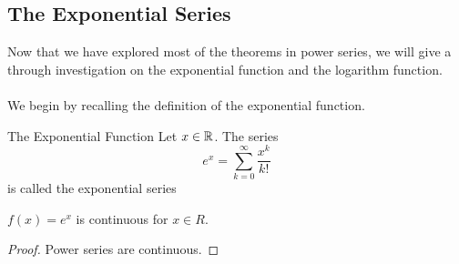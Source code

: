 \documentclass[a4paper]{article}
\begin{document}
\subsection{The Exponential Series}
Now that we have explored most of the theorems in power series, we will give a through investigation on the exponential function and the logarithm function. \\~\\
We begin by recalling the definition of the exponential function. 
\begin{defn}{The Exponential Function}{} Let $x\in\mathbb{R}$. The series $$e^x=\sum_{k=0}^\infty \frac{x^k}{k!}$$ is called the exponential series
\end{defn}

\begin{thm}{}{} $f(x)=e^x$ is continuous for $x\in R$. \tcbline
\begin{proof} Power series are continuous. 
\end{proof}
\end{thm}
\end{document}
